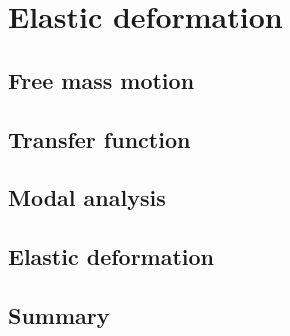 
\chapter{Elastic deformation} %

\label{Chapter4} %

\section{Free mass motion}
\section{Transfer function}
\section{Modal analysis}
\section{Elastic deformation}
\section{Summary}